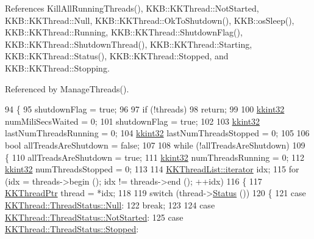 References Kill\+All\+Running\+Threads(), K\+K\+B\+::\+K\+K\+Thread\+::\+Not\+Started, K\+K\+B\+::\+K\+K\+Thread\+::\+Null, K\+K\+B\+::\+K\+K\+Thread\+::\+Ok\+To\+Shutdown(), K\+K\+B\+::os\+Sleep(), K\+K\+B\+::\+K\+K\+Thread\+::\+Running, K\+K\+B\+::\+K\+K\+Thread\+::\+Shutdown\+Flag(), K\+K\+B\+::\+K\+K\+Thread\+::\+Shutdown\+Thread(), K\+K\+B\+::\+K\+K\+Thread\+::\+Starting, K\+K\+B\+::\+K\+K\+Thread\+::\+Status(), K\+K\+B\+::\+K\+K\+Thread\+::\+Stopped, and K\+K\+B\+::\+K\+K\+Thread\+::\+Stopping.



Referenced by Manage\+Threads().


\begin{DoxyCode}
94 \{
95   shutdownFlag = \textcolor{keyword}{true};
96 
97   \textcolor{keywordflow}{if}  (!threads)
98     \textcolor{keywordflow}{return};
99 
100   \hyperlink{namespace_k_k_b_a8fa4952cc84fda1de4bec1fbdd8d5b1b}{kkint32}  numMiliSecsWaited = 0;
101   shutdownFlag = \textcolor{keyword}{true};
102 
103   \hyperlink{namespace_k_k_b_a8fa4952cc84fda1de4bec1fbdd8d5b1b}{kkint32}  lastNumThreadsRunning = 0;
104   \hyperlink{namespace_k_k_b_a8fa4952cc84fda1de4bec1fbdd8d5b1b}{kkint32}  lastNumThreadsStopped = 0;
105 
106   \textcolor{keywordtype}{bool}  allTreadsAreShutdown = \textcolor{keyword}{false};
107 
108   \textcolor{keywordflow}{while}  (!allTreadsAreShutdown)
109   \{
110     allTreadsAreShutdown = \textcolor{keyword}{true};
111     \hyperlink{namespace_k_k_b_a8fa4952cc84fda1de4bec1fbdd8d5b1b}{kkint32}  numThreadsRunning = 0;
112     \hyperlink{namespace_k_k_b_a8fa4952cc84fda1de4bec1fbdd8d5b1b}{kkint32}  numThreadsStopped = 0;
113 
114     \hyperlink{class_k_k_b_1_1_k_k_queue_aa3c2796a726eea468b94132a9fbf2cfe}{KKThreadList::iterator}  idx;
115     \textcolor{keywordflow}{for}  (idx = threads->begin ();  idx != threads->end ();  ++idx)
116     \{
117       \hyperlink{class_k_k_b_1_1_k_k_thread}{KKThreadPtr}  thread = *idx;
118 
119       \textcolor{keywordflow}{switch}  (thread->\hyperlink{class_k_k_b_1_1_k_k_thread_a8b6636f59306caf89c24d9f756293d71}{Status} ())
120       \{
121       \textcolor{keywordflow}{case}  \hyperlink{class_k_k_b_1_1_k_k_thread_a3f72bb1988ae5dd353b39260ae0acc72abbb93ef26e3c101ff11cdd21cab08a94}{KKThread::ThreadStatus::Null}:
122         \textcolor{keywordflow}{break};
123 
124       \textcolor{keywordflow}{case}  \hyperlink{class_k_k_b_1_1_k_k_thread_a3f72bb1988ae5dd353b39260ae0acc72afa7be7845bc42b3491d9d0377958be94}{KKThread::ThreadStatus::NotStarted}:
125       \textcolor{keywordflow}{case}  \hyperlink{class_k_k_b_1_1_k_k_thread_a3f72bb1988ae5dd353b39260ae0acc72ac23e2b09ebe6bf4cb5e2a9abe85c0be2}{KKThread::ThreadStatus::Stopped}:

\end{DoxyCode}
